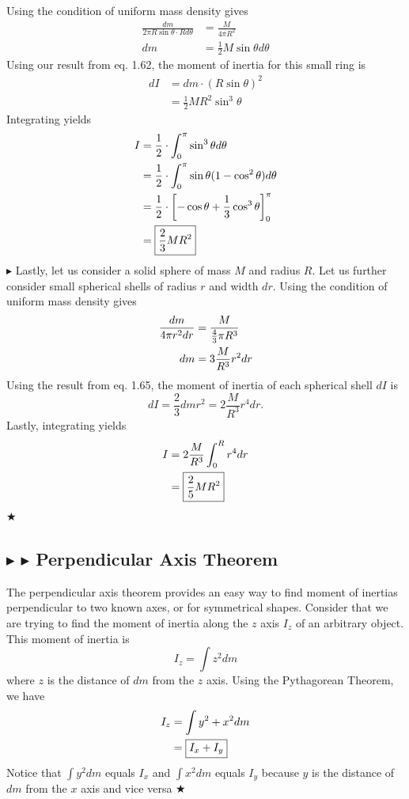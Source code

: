 \noindent Using the condition of uniform mass density gives
\begin{align*}
    \frac{dm}{2\pi R\sin\theta \cdot Rd\theta} &= \frac{M}{4\pi R^2} \\
    dm &= \frac12 M \sin\theta d\theta
\end{align*}
\noindent Using our result from eq. 1.62, the moment of inertia for this small ring is 
\begin{align*}
    dI &= dm \cdot (R\sin\theta)^2 \\
    &= \frac12 MR^2 \sin^3\theta
\end{align*}
\noindent Integrating yields
\begin{align}
    I &= \frac12 \cdot \int_0^\pi \sin^3 \theta d\theta \nonumber \\
    &= \frac12 \cdot \int_0^\pi \sin\theta(1-\cos^2\theta) d\theta \nonumber \\
    &= \frac12 \cdot \left[-\cos\theta +\frac13 \cos^3\theta\right]_0^\pi \nonumber \\
    &= \boxed{\frac23 MR^2}
\end{align}
\noindent $\blacktriangleright$ Lastly, let us consider a solid sphere of mass $M$ and radius $R$. Let us further consider small spherical shells of radius $r$ and width $dr$. Using the condition of uniform mass density gives
\begin{align*}
    \frac{dm}{4\pi r^2 dr} &= \frac{M}{\frac43 \pi R^3} \nonumber \\
    dm &= 3\frac{M}{R^3} r^2 dr
\end{align*}
\noindent Using the result from eq. 1.65, the moment of inertia of each spherical shell $dI$ is
\begin{equation*}
    dI = \frac23 dm r^2 = 2\frac{M}{R^3} r^4 dr.
\end{equation*}
\noindent Lastly, integrating yields
\begin{align}
    I &= 2\frac{M}{R^3} \int_0^R r^4 dr \nonumber \\
    &= \boxed{\frac25 MR^2}
\end{align}
$\bigstar$

%
%
\subsection{\color{Goldenrod} $\blacktriangleright$ \color{Orchid} $\blacktriangleright$ \color{black} Perpendicular Axis Theorem}\label{1.4.5}
The perpendicular axis theorem provides an easy way to find moment of inertias perpendicular to two known axes, or for symmetrical shapes. Consider that we are trying to find the moment of inertia along the $z$ axis $I_z$ of an arbitrary object. This moment of inertia is
\begin{equation*}
    I_z = \int z^2 dm
\end{equation*}
\noindent where $z$ is the distance of $dm$ from the $z$ axis. Using the Pythagorean Theorem, we have
\begin{align}
    I_z &= \int y^2 + x^2 dm \nonumber \\
    &= \boxed{I_x + I_y}
\end{align}
\noindent Notice that $\int y^2 dm$ equals $I_x$ and $\int x^2 dm$ equals $I_y$ because $y$ is the distance of $dm$ from the $x$ axis and vice versa $\bigstar$

